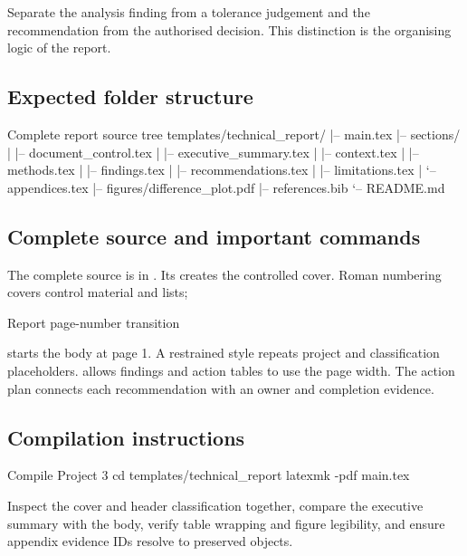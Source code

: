 Separate the analysis finding from a tolerance judgement and the recommendation
from the authorised decision. This distinction is the organising logic of the
report.

\subsection{Expected folder structure}

\begin{terminalcode}{Complete report source tree}
templates/technical_report/
|-- main.tex
|-- sections/
|   |-- document_control.tex
|   |-- executive_summary.tex
|   |-- context.tex
|   |-- methods.tex
|   |-- findings.tex
|   |-- recommendations.tex
|   |-- limitations.tex
|   `-- appendices.tex
|-- figures/difference_plot.pdf
|-- references.bib
`-- README.md
\end{terminalcode}

\subsection{Complete source and important commands}

The complete source is in . Its
 creates the controlled cover. Roman numbering covers control
material and lists;

\begin{latexcode}{Report page-number transition}
\clearpage
{}
\end{latexcode}

starts the body at page 1. A restrained  style repeats project and
classification placeholders.  allows findings and action tables to
use the page width. The action plan connects each recommendation with an owner
and completion evidence.

\subsection{Compilation instructions}

\begin{terminalcode}{Compile Project 3}
cd templates/technical_report
latexmk -pdf main.tex
\end{terminalcode}

Inspect the cover and header classification together, compare the executive
summary with the body, verify table wrapping and figure legibility, and ensure
appendix evidence IDs resolve to preserved objects.

